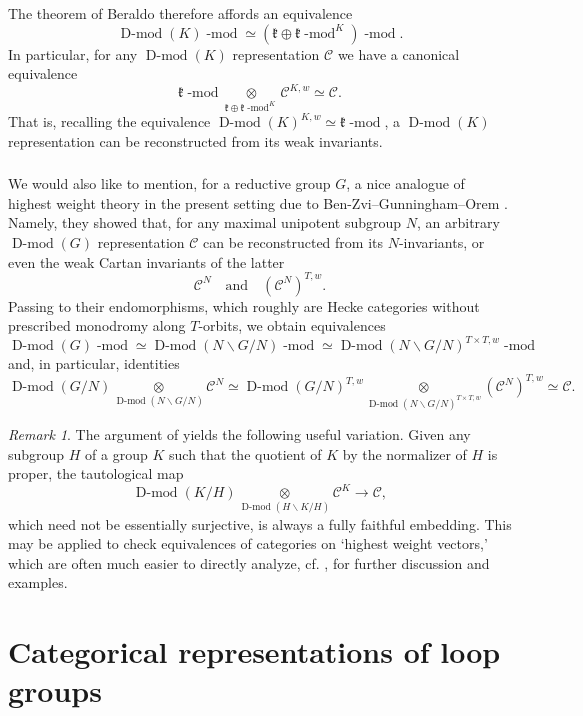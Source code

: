 \documentclass[10pt]{amsart}
\newcommand{\on}{\operatorname}
\renewcommand{\mod}{\on{-mod}}
\newcommand{\Dmod}{\on{D-mod}}
\theoremstyle{remark}
\newtheorem{re}[subsubsection]{Remark}
\newcommand{\fk}{\mathfrak{k}}
\numberwithin{equation}{section}
\newcommand{\sC}{\mathscr{C}}
\renewcommand{\mod}{\operatorname{-mod}}
\begin{document}
The theorem of Beraldo therefore affords an equivalence 
%
\[
    \Dmod(K)\mod \simeq (\fk \oplus \fk\mod^K)\mod.
\]
%
In particular, for any $\Dmod(K)$ representation $\sC$ we have a 
canonical equivalence 
%
\[
    \fk\mod \underset{ \fk\oplus \fk\mod^K} \otimes \sC^{K, w} \simeq \sC.
\]
%
That is, recalling the equivalence $\Dmod(K)^{K,w} \simeq \fk\mod$, a 
$\Dmod(K)$ representation can be reconstructed from its weak invariants. 

\subsubsection{}We would also like to mention, for a reductive group $G$, a 
nice analogue of highest weight theory in the present setting due to 
Ben-Zvi--Gunningham--Orem \cite{BZO}. Namely, they showed that, for any maximal unipotent subgroup $N$, an arbitrary $\Dmod(G)$ representation $\sC$ can be reconstructed from its 
$N$-invariants, or even the weak Cartan 
invariants of the latter 
%
\[
   \sC^N \quad \text{and} \quad (\sC^N)^{T,w}.
\]
%
Passing to their endomorphisms, which roughly are Hecke categories without 
prescribed monodromy along $T$-orbits, we obtain equivalences 
%
\[
  \Dmod(G)\mod \simeq \Dmod(N \backslash G / N)\mod \simeq \Dmod(N \backslash G 
  / N)^{T \times T, w}\mod
\]
%
and, in particular, identities
%
\[
   \Dmod(G/N) \underset{ \Dmod(N \backslash G / N)} \otimes  \sC^N \simeq  
   \Dmod(G/N)^{T,w} \underset{ \Dmod(N \backslash G / N)^{T \times T,w}}  
   \otimes 
   (\sC^{N})^{T,w} \simeq \sC. 
\]
%


\begin{re}The argument of \cite{BZO} yields the following useful variation. Given any 
subgroup $H$ of a 
group $K$ such that the quotient of $K$ by the normalizer of $H$ is proper, 
the tautological map 
	\[
	     \Dmod(K/H) \underset{\Dmod(H \backslash K / H)} \otimes \sC^K 
	     \rightarrow \sC,
	\]
which need not be essentially surjective, is always a fully faithful 
embedding. This may be applied to check equivalences 
of categories on `highest weight vectors,' which are often much easier to 
directly analyze, cf. \cite{ahc}, \cite{yangmoyprasad} for further discussion and examples. 	
\end{re}




\section{Categorical representations of loop groups}
\label{s:catloop}
\end{document}
